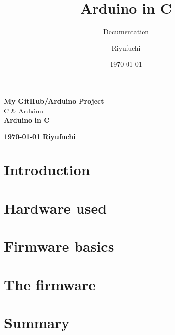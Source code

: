 \documentclass[12pt,a4paper,titlepage]{scrreprt}
\title{\vspace{6cm}Arduino in C}
\subtitle{Documentation}
\author{Riyufuchi}
\date{\today}
\begin{document}
	
	
	\begin{titlepage}
		\begin{center}
			{\Large \textbf{My GitHub/Arduino Project}} \\
			{\Large C \& Arduino} \\
			\vfill
			{\Huge \textbf{Arduino in C}}
			\vfill
		\end{center}
		{\large\textbf{ \today}} \hfill {\large \textbf{Riyufuchi}}
	\end{titlepage}
	
	\tableofcontents
	\newpage
	
	\clearpage
	\printglossary[type=main, title=Glossary]
	
	\clearpage
	\printglossary[type=\acronymtype, style=mystyle]
	
	\chapter{Introduction}
	
	
	\chapter{Hardware used}
	
	
	\chapter{Firmware basics}
	
	
	\chapter{The firmware}
	
	
	\chapter*{Summary}
	
	\lstlistoflistings
	\listoffigures
\end{document}

